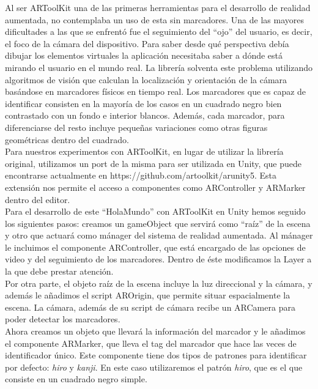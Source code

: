 Al ser ARToolKit una de las primeras herramientas para el desarrollo de realidad aumentada, no contemplaba un uso de esta sin marcadores. Una de las mayores dificultades a las que se enfrentó fue el seguimiento del “ojo” del usuario, es decir, el foco de la cámara del dispositivo. Para saber desde qué perspectiva debía dibujar los elementos virtuales la aplicación necesitaba saber a dónde está mirando el usuario en el mundo real. La librería solventa este problema utilizando algoritmos de visión que calculan la localización y orientación de la cámara basándose en marcadores físicos en tiempo real.
Los marcadores que es capaz de identificar consisten en la mayoría de los casos en un cuadrado negro bien contrastado con un fondo e interior blancos. Además, cada marcador, para diferenciarse del resto incluye pequeñas variaciones como otras figuras geométricas dentro del cuadrado.\\

Para nuestros experimentos con ARToolKit, en lugar de utilizar la librería original, utilizamos un port de la misma para ser utilizada en Unity, que puede encontrarse actualmente en https://github.com/artoolkit/arunity5. Esta extensión nos permite el acceso a componentes como ARController y ARMarker dentro del editor.\\

Para el desarrollo de este “HolaMundo” con ARToolKit en Unity hemos seguido los siguientes pasos: creamos un gameObject  que servirá como “raíz” de la escena y otro que actuará como mánager del sistema de realidad aumentada. Al mánager le incluimos el componente ARController, que está encargado de las opciones de video y del seguimiento de los marcadores. Dentro de éste modificamos la Layer a la que debe prestar atención. \\

Por otra parte, el objeto raíz de la escena incluye la luz direccional y la cámara, y además le añadimos el script AROrigin, que permite situar espacialmente la escena. La cámara, además de su script de cámara recibe un ARCamera para poder detectar los marcadores.\\

Ahora creamos un objeto que llevará la información del marcador y le añadimos el componente ARMarker, que lleva el tag del marcador que hace las veces de identificador único. Este componente tiene dos tipos de patrones para identificar por defecto: \textit{hiro} y \textit{kanji}. En este caso utilizaremos el patrón \textit{hiro}, que es el que consiste en un cuadrado negro simple.\\

